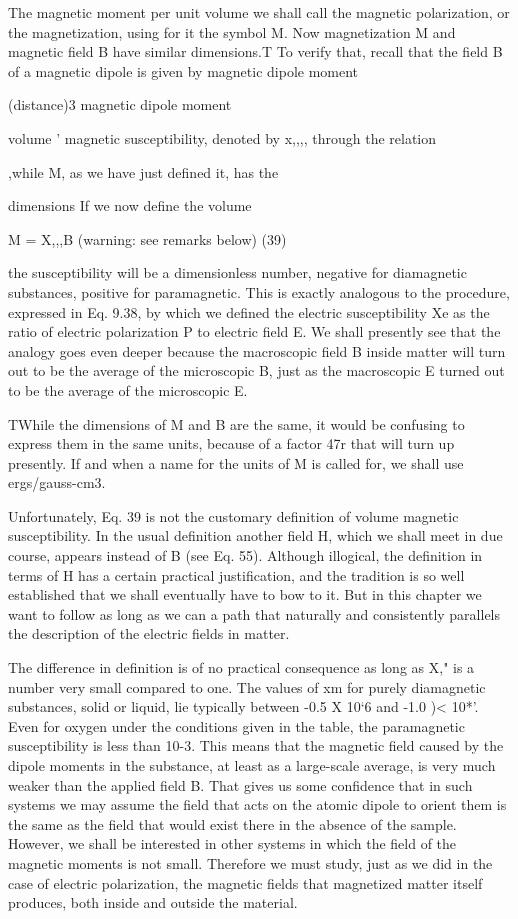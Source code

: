 {The magnetic moment per unit volume we shall call the magnetic
polarization, or the magnetization, using for it the symbol M. Now
magnetization M and magnetic field B have similar dimensions.T
To verify that, recall that the field B of a magnetic dipole is given by
magnetic dipole moment

(distance)3
magnetic dipole moment

volume '
magnetic susceptibility, denoted by x,,,, through the relation

,while M, as we have just defined it, has the

dimensions If we now define the volume

M = X,,,B (warning: see remarks below) (39)

the susceptibility will be a dimensionless number, negative for 
diamagnetic substances, positive for paramagnetic. This is exactly
analogous to the procedure, expressed in Eq. 9.38, by which we
defined the electric susceptibility Xe as the ratio of electric polarization
P to electric field E. We shall presently see that the analogy goes
even deeper because the macroscopic field B inside matter will turn
out to be the average of the microscopic B, just as the macroscopic E
turned out to be the average of the microscopic E.

TWhile the dimensions of M and B are the same, it would be confusing to express
them in the same units, because of a factor 47r that will turn up presently. If and
when a name for the units of M is called for, we shall use ergs/gauss-cm3.

Unfortunately, Eq. 39 is not the customary definition of volume
magnetic susceptibility. In the usual definition another field H,
which we shall meet in due course, appears instead of B (see Eq. 55).
Although illogical, the definition in terms of H has a certain practical
justification, and the tradition is so well established that we shall
eventually have to bow to it. But in this chapter we want to follow
as long as we can a path that naturally and consistently parallels the
description of the electric fields in matter.

The difference in definition is of no practical consequence as long
as X," is a number very small compared to one. The values of xm
for purely diamagnetic substances, solid or liquid, lie typically between
-0.5 X 10‘6 and -1.0 )< 10*'. Even for oxygen under the
conditions given in the table, the paramagnetic susceptibility is less
than 10-3. This means that the magnetic field caused by the dipole
moments in the substance, at least as a large-scale average, is very
much weaker than the applied field B. That gives us some confidence
that in such systems we may assume the field that acts on the
atomic dipole to orient them is the same as the field that would exist
there in the absence of the sample. However, we shall be interested
in other systems in which the field of the magnetic moments is not
small. Therefore we must study, just as we did in the case of electric
polarization, the magnetic fields that magnetized matter itself 
produces, both inside and outside the material.

}
